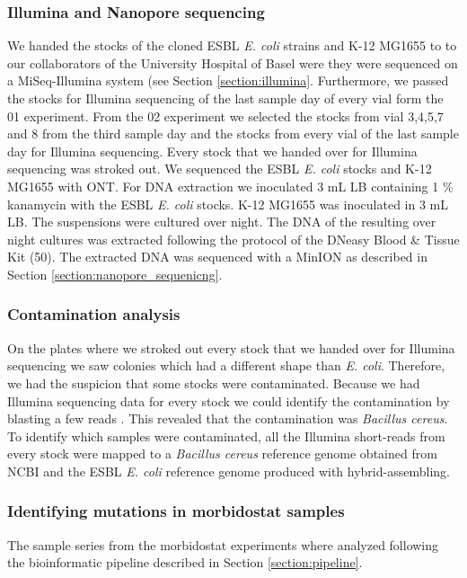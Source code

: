 \subsubsection{Illumina and Nanopore sequencing}
We handed the stocks of the cloned ESBL \textit{E. coli} strains and K-12 MG1655 to to our collaborators of the University Hospital of Basel were they were sequenced on a MiSeq-Illumina system (see Section \ref{section:illumina}.
Furthermore, we passed the stocks for Illumina sequencing of the last sample day of every vial form the 01 experiment. 
From the 02 experiment we selected the stocks from vial 3,4,5,7 and 8 from the third sample day and the stocks from every vial of the last sample day for Illumina sequencing. Every stock that we handed over for Illumina sequencing was stroked out. 
We sequenced the ESBL \textit{E. coli} stocks and K-12 MG1655 with ONT. For DNA extraction we inoculated 3 mL LB containing 1 \% kanamycin with the ESBL \textit{E. coli} stocks. K-12 MG1655 was inoculated in 3 mL LB. The suspensions were cultured over night. The DNA of the resulting over night cultures was extracted following the protocol of the DNeasy Blood \& Tissue Kit (50). The extracted DNA was sequenced with a MinION as described in Section \ref{section:nanopore_sequenicng}. 

\subsubsection{Contamination analysis}
On the plates where we stroked out every stock that we handed over for Illumina sequencing we saw colonies which had a different shape than \textit{E. coli}. Therefore, we had the suspicion that some stocks were contaminated. Because we had Illumina sequencing data for every stock we could identify the contamination by blasting a few reads \cite{madden_blast_2003}. This revealed that the contamination was \textit{Bacillus cereus}. To identify which samples were contaminated, all the Illumina short-reads from every stock  were mapped to a \textit{Bacillus cereus} reference genome obtained from NCBI \cite{noauthor_bacillus_nodate} and the ESBL \textit{E. coli} reference genome produced with hybrid-assembling.

\subsubsection{Identifying mutations in morbidostat samples}
The sample series from the morbidostat experiments where analyzed following the bioinformatic pipeline described in Section \ref{section:pipeline}. 